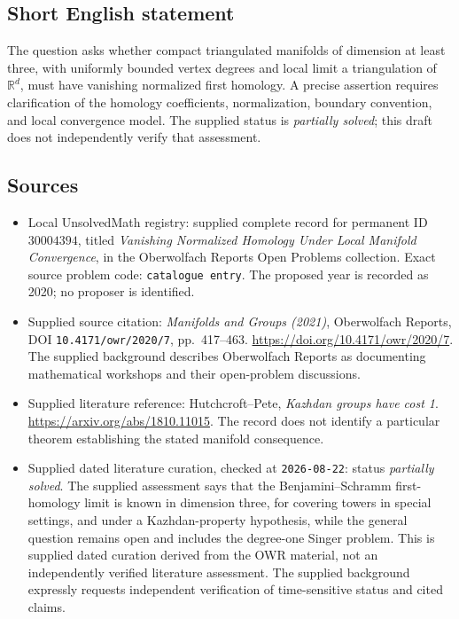 \documentclass[11pt]{article}
\newcommand{\R}{\mathbb{R}}
\begin{document}
\subsection{Short English statement}
The question asks whether compact triangulated manifolds of dimension at least three, with uniformly bounded vertex degrees and local limit a triangulation of \(\R^d\), must have vanishing normalized first homology. A precise assertion requires clarification of the homology coefficients, normalization, boundary convention, and local convergence model. The supplied status is \emph{partially solved}; this draft does not independently verify that assessment.
\subsection{Sources}
\begin{itemize}
\item Local UnsolvedMath registry: supplied complete record for permanent ID \(30004394\), titled \emph{Vanishing Normalized Homology Under Local Manifold Convergence}, in the Oberwolfach Reports Open Problems collection. Exact source problem code: \texttt{catalogue entry}. The proposed year is recorded as 2020; no proposer is identified.
\item Supplied source citation: \emph{Manifolds and Groups (2021)}, Oberwolfach Reports, DOI \texttt{10.4171/owr/2020/7}, pp.~417--463. \url{https://doi.org/10.4171/owr/2020/7}. The supplied background describes Oberwolfach Reports as documenting mathematical workshops and their open-problem discussions.
\item Supplied literature reference: Hutchcroft--Pete, \emph{Kazhdan groups have cost 1}. \url{https://arxiv.org/abs/1810.11015}. The record does not identify a particular theorem establishing the stated manifold consequence.
\item Supplied dated literature curation, checked at \texttt{2026-08-22}: status \emph{partially solved}. The supplied assessment says that the Benjamini--Schramm first-homology limit is known in dimension three, for covering towers in special settings, and under a Kazhdan-property hypothesis, while the general question remains open and includes the degree-one Singer problem. This is supplied dated curation derived from the OWR material, not an independently verified literature assessment. The supplied background expressly requests independent verification of time-sensitive status and cited claims.
\end{itemize}
\end{document}
